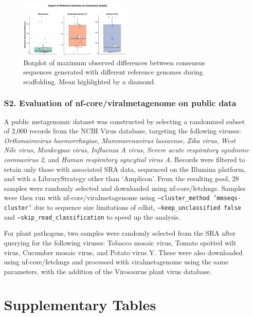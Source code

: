 \begin{figure}[!h]
    \centering
    \includegraphics[width=0.5\textwidth]{Fig/fig2.png}
    \caption{Boxplot of maximum observed differences between consensus sequences generated with different reference genomes during scaffolding. Mean highlighted by a diamond.}
    \label{fig:reference-influence-supp}
\end{figure}


\subsubsection*{S2. Evaluation of nf-core/viralmetagenome on public data}

A public metagenomic dataset was constructed by selecting a randomized subset of 2,000 records from the NCBI Virus database, targeting the following viruses: \textit{Orthonairovirus haemorrhagiae}, \textit{Mammarenavirus lassaense}, \textit{Zika virus}, \textit{West Nile virus}, \textit{Monkeypox virus}, \textit{Influenza A virus}, \textit{Severe acute respiratory syndrome coronavirus 2}, and \textit{Human respiratory syncytial virus A}. Records were filtered to retain only those with associated SRA data, sequenced on the Illumina platform, and with a LibraryStrategy other than ‘Amplicon’. From the resulting pool, 28 samples were randomly selected and downloaded using nf-core/fetchngs. Samples were then run with nf-core/viralmetagenome using \texttt{--cluster\_method 'mmseqs-cluster'} due to sequence size limitations of cdhit, \texttt{--keep\_unclassified false} and \texttt{--skip\_read\_classification} to speed up the analysis.

For plant pathogens, two samples were randomly selected from the SRA after querying for the following viruses: Tobacco mosaic virus, Tomato spotted wilt virus, Cucumber mosaic virus, and Potato virus Y. These were also downloaded using nf-core/fetchngs and processed with viralmetagenome using the same parameters, with the addition of the Virosaurus plant virus database.

\newpage

\section*{Supplementary Tables}

